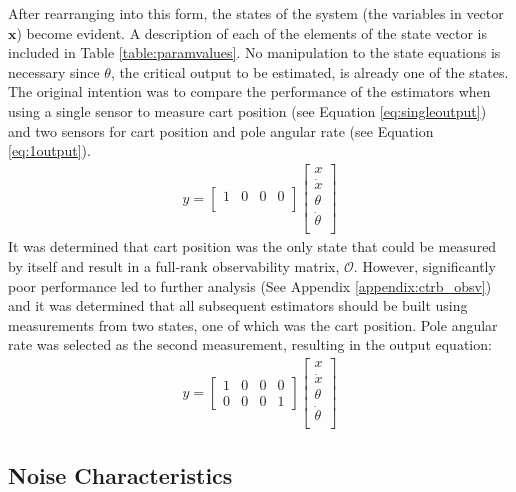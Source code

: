 \documentclass{article}
\newcommand{\matr}[1]{\bm{#1}}     %
\begin{document}
After rearranging into this form, the states of the system (the variables in vector $\matr{x}$) become evident. A description of each of the elements of the state vector is included in Table \ref{table:paramvalues}. No manipulation to the state equations is necessary since $\theta$, the critical output to be estimated, is already one of the states.\\

The original intention was to compare the performance of the estimators when using a single sensor to measure cart position (see Equation \ref{eq:singleoutput}) and two sensors for cart position and pole angular rate (see Equation \ref{eq:1output}). 
 \begin{align}
 y = \begin{bmatrix}
 1 & 0 & 0 & 0 \\
 \end{bmatrix} \begin{bmatrix}
 	x \\
 	\dot{x} \\
 	\theta \\
 	\dot{\theta} \\
 \end{bmatrix}
 \label{eq:singleoutput}
 \end{align}
 It was determined that cart position was the only state that could be measured by itself and result in a full-rank observability matrix, $\mathcal{O}$. However, significantly poor performance led to further analysis (See Appendix \ref{appendix:ctrb_obsv}) and it was determined that all subsequent estimators should be built using measurements from two states, one of which was the cart position. Pole angular rate was selected as the second measurement, resulting in the output equation:
\begin{align}
y = \begin{bmatrix}
1 & 0 & 0 & 0 \\
0 & 0 & 0 & 1
\end{bmatrix} \begin{bmatrix}
	x \\
	\dot{x} \\
	\theta \\
	\dot{\theta} \\
\end{bmatrix}
\label{eq:1output}
\end{align}

\subsection{Noise Characteristics}\label{ssecsensornoise}
\end{document}
